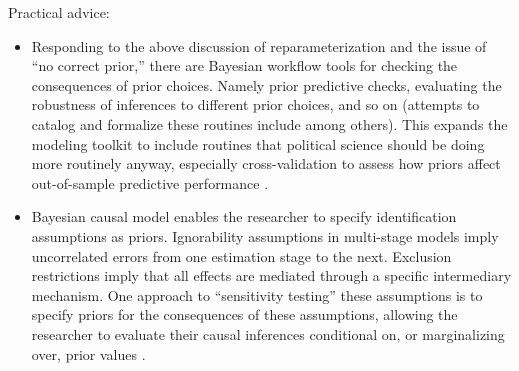 \documentclass[12pt
              ]{article}
\begin{document}
Practical advice:
\begin{itemize}
  \item Responding to the above discussion of reparameterization and the issue of ``no correct prior,'' there are Bayesian workflow tools for checking the consequences of prior choices.
  Namely prior predictive checks, evaluating the robustness of inferences to different prior choices, and so on (attempts to catalog and formalize these routines include \cite{gabry-et-al:2019:visualization} among others).
  This expands the modeling toolkit to include routines that political science should be doing more routinely anyway, especially cross-validation to assess how priors affect out-of-sample predictive performance \parencite{vehtari-at-al:2017:loo-waic}.
  \item Bayesian causal model enables the researcher to specify identification assumptions as priors.
  Ignorability assumptions in multi-stage models imply uncorrelated errors from one estimation stage to the next.
  Exclusion restrictions imply that all effects are mediated through a specific intermediary mechanism.
  One approach to ``sensitivity testing'' these assumptions is to specify priors for the consequences of these assumptions, allowing the researcher to evaluate their causal inferences conditional on, or marginalizing over, prior values \parencite[section~5]{oganisian-roy:2020:bayes-estimation}.
\end{itemize}
\end{document}
